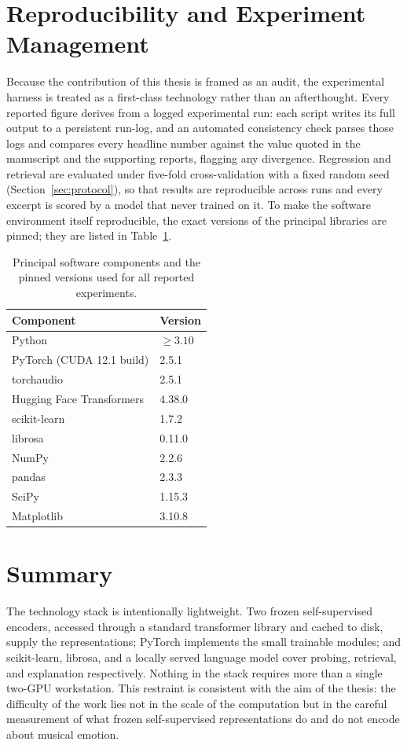 \documentclass[12pt]{report}
\begin{document}
\section{Reproducibility and Experiment Management}

Because the contribution of this thesis is framed as an audit, the experimental harness is treated as a first-class technology rather than an afterthought. Every reported figure derives from a logged experimental run: each script writes its full output to a persistent run-log, and an automated consistency check parses those logs and compares every headline number against the value quoted in the manuscript and the supporting reports, flagging any divergence. Regression and retrieval are evaluated under five-fold cross-validation with a fixed random seed (Section~\ref{sec:protocol}), so that results are reproducible across runs and every excerpt is scored by a model that never trained on it. To make the software environment itself reproducible, the exact versions of the principal libraries are pinned; they are listed in Table~\ref{tab:software}.

\begin{table}[t]
\centering
\small
\begin{tabular}{ll}
\toprule
\textbf{Component} & \textbf{Version} \\
\midrule
Python & $\geq 3.10$ \\
PyTorch (CUDA 12.1 build) & 2.5.1 \\
torchaudio & 2.5.1 \\
Hugging Face Transformers & 4.38.0 \\
scikit-learn & 1.7.2 \\
librosa & 0.11.0 \\
NumPy & 2.2.6 \\
pandas & 2.3.3 \\
SciPy & 1.15.3 \\
Matplotlib & 3.10.8 \\
\bottomrule
\end{tabular}
\caption{Principal software components and the pinned versions used for all reported experiments.}
\label{tab:software}
\end{table}

\section{Summary}

The technology stack is intentionally lightweight. Two frozen self-supervised encoders, accessed through a standard transformer library and cached to disk, supply the representations; PyTorch implements the small trainable modules; and scikit-learn, librosa, and a locally served language model cover probing, retrieval, and explanation respectively. Nothing in the stack requires more than a single two-GPU workstation. This restraint is consistent with the aim of the thesis: the difficulty of the work lies not in the scale of the computation but in the careful measurement of what frozen self-supervised representations do and do not encode about musical emotion.
\end{document}
